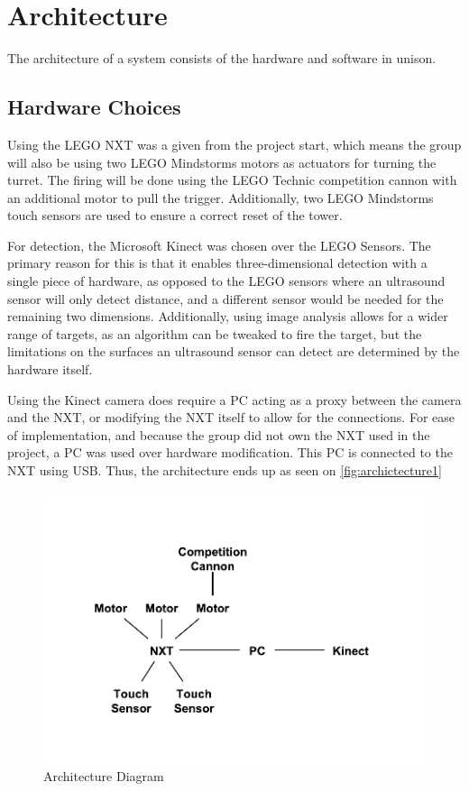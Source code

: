 \section{Architecture}

The architecture of a system consists of the hardware and software in unison.

\subsection{Hardware Choices}

Using the LEGO NXT was a given from the project start, which means the group will also be using two LEGO Mindstorms
motors as actuators for turning the turret. The firing will be done using the LEGO Technic competition cannon  with an additional motor to pull the trigger. Additionally, two LEGO Mindstorms touch sensors are used to ensure
a correct reset of the tower.

For detection, the Microsoft Kinect was chosen over the LEGO Sensors. The primary reason for this is that
it enables three-dimensional detection with a single piece of hardware, as opposed to the LEGO sensors where
an ultrasound sensor will only detect distance, and a different sensor would be needed for the remaining two dimensions.
Additionally, using image analysis allows for a wider range of targets, as an algorithm can be tweaked to
fire the target, but the limitations on the surfaces an ultrasound sensor can detect are determined by the
hardware itself.

Using the Kinect camera does require a PC acting as a proxy between the camera and the NXT, or modifying the
NXT itself to allow for the connections. For ease of implementation, and because the group did not own the NXT
used in the project, a PC was used over hardware modification. This PC is connected to the NXT using USB.
Thus, the architecture ends up as seen on \autoref{fig:archictecture1}

\begin{figure}[hbtp]
\includegraphics[width=1\textwidth]{img/architecture1.pdf}
\caption{Architecture Diagram} 
\label{fig:archictecture1} 
\end{figure}

